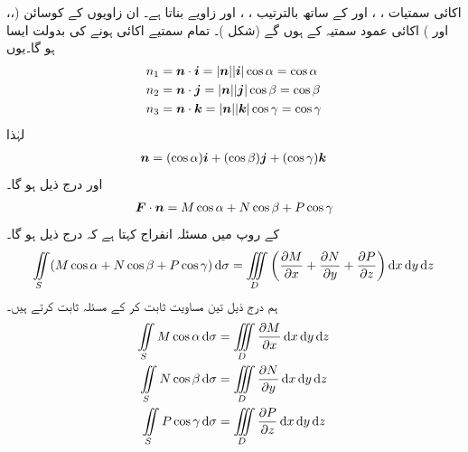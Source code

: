 اکائی سمتیات ، ، اور  کے ساتھ      بالترتیب   ، ، اور   زاویے بناتا ہے۔ ان زاویوں کے کوسائن (،،  اور ) اکائی عمود سمتیہ  کے   ہوں گے   (شکل )۔
  تمام سمتیے  اکائی  ہونے کی بدولت  ایسا  ہو گا۔یوں 
\begin{align*}
n_1&={\boldsymbol{n}}\cdot{\boldsymbol{i}}=|{\boldsymbol{n}}||{\boldsymbol{i}}|\cos\alpha=\cos\alpha\\
n_2&={\boldsymbol{n}}\cdot{\boldsymbol{j}}=|{\boldsymbol{n}}||{\boldsymbol{j}}|\cos\beta=\cos\beta\\
n_3&={\boldsymbol{n}}\cdot{\boldsymbol{k}}=|{\boldsymbol{n}}||{\boldsymbol{k}}|\cos\gamma=\cos\gamma
\end{align*}
لہٰذا
\begin{align*}
{\boldsymbol{n}}=(\cos\alpha){\boldsymbol{i}}+(\cos\beta){\boldsymbol{j}}+(\cos\gamma){\boldsymbol{k}}
\end{align*}
اور درج ذیل ہو گا۔
\begin{align*}
{\ensuremath{{\boldsymbol{F}}}}\cdot{\boldsymbol{n}}=M\cos\alpha+N\cos\beta+P\cos\gamma
\end{align*}
 کے روپ میں مسئلہ انفراج  کہتا ہے کہ  درج ذیل  ہو گا۔
\begin{align*}
\iint\limits_S(M\cos\alpha+N\cos\beta+P\cos\gamma)\dif\sigma=\iiint\limits_D\left(\frac{\partial M}{\partial x}+\frac{\partial N}{\partial y}+\frac{\partial P}{\partial z}\right)\dif x\dif y\dif z
\end{align*}
ہم درج ذیل تین  مساویت ثابت کر کے مسئلہ ثابت کرتے ہیں۔
\begin{align}
\iint\limits_S M\cos\alpha\dif \sigma&=\iiint\limits_D \frac{\partial M}{\partial x}\dif x\dif y\dif z\label{مساوات_سمتی_میدان_پھیلا_الف}\\
\iint\limits_S N\cos\beta\dif \sigma&=\iiint\limits_D \frac{\partial N}{\partial y}\dif x\dif y\dif z\label{مساوات_سمتی_میدان_پھیلا_ب}\\
\iint\limits_S P\cos\gamma\dif \sigma&=\iiint\limits_D \frac{\partial P}{\partial z}\dif x\dif y\dif z\label{مساوات_سمتی_میدان_پھیلا_پ}
\end{align}


